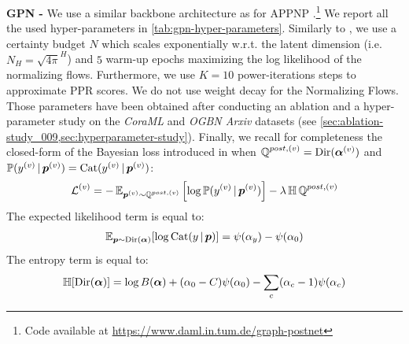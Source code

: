 \textbf{GPN - } We use a similar backbone architecture as for APPNP \citep{Klicpera2018}.\footnote{Code available at \url{https://www.daml.in.tum.de/graph-postnet}} We report all the used hyper-parameters in \cref{tab:gpn-hyper-parameters}. Similarly to \citep{NatPN2021}, we use a certainty budget $N$ which scales exponentially w.r.t. the latent dimension (i.e. $N_H=\sqrt{4 \pi}^H$) and $5$ warm-up epochs maximizing the log likelihood of the normalizing flows. Furthermore, we use $K=10$ power-iterations steps to approximate PPR scores. We do not use weight decay for the Normalizing Flows. Those parameters have been obtained after conducting an ablation and a hyper-parameter study on the \emph{CoraML} and \emph{OGBN Arxiv} datasets (see \cref{sec:ablation-study_009,sec:hyperparameter-study}). Finally, we recall for completeness the closed-form of the Bayesian loss introduced in \citep{charpentier2020} when $\operatorname{\mathbb{Q}}^{post, (v)}=\operatorname{Dir}(\bm{\alpha}^{(v)})$ and $\mathbb{P}(y^{(v)} \,|\, \bm{p}^{(v)}) = \operatorname{Cat}(y^{(v)} \,|\, \bm{p}^{(v)})$:
\begin{equation}
    \operatorname{\mathcal{L}}^{(v)} = -\operatorname{\mathbb{E}}_{\bm{p}^{(v)}\sim \operatorname{\mathbb{Q}}^{post, (v)}}\left[\log \mathbb{P}(y^{(v)} \,|\, \bm{p}^{(v)})\right] - \lambda \operatorname{\mathbb{H}}{\operatorname{\mathbb{Q}}^{post, (v)}}
\end{equation}
The expected likelihood term is equal to:
\begin{align}\label{eq:expected-likelihood-cat-dir_009}
    \operatorname{\mathbb{E}}_{\bm{p} \sim \operatorname{Dir}(\bm{\alpha})}[\log \operatorname{Cat}(y \,|\, \bm{p})] = \psi(\alpha_{y}) - \psi(\alpha_0)
\end{align}
The entropy term is equal to:
\begin{align}\label{eq:density-entropy-dirichlet_009}
        \operatorname{\mathbb{H}}[\operatorname{Dir}(\bm{\alpha})] = \log B(\bm{\alpha}) + (\alpha_0 - C) \psi(\alpha_0) - \sum_c (\alpha_c - 1) \psi(\alpha_c)
\end{align}



